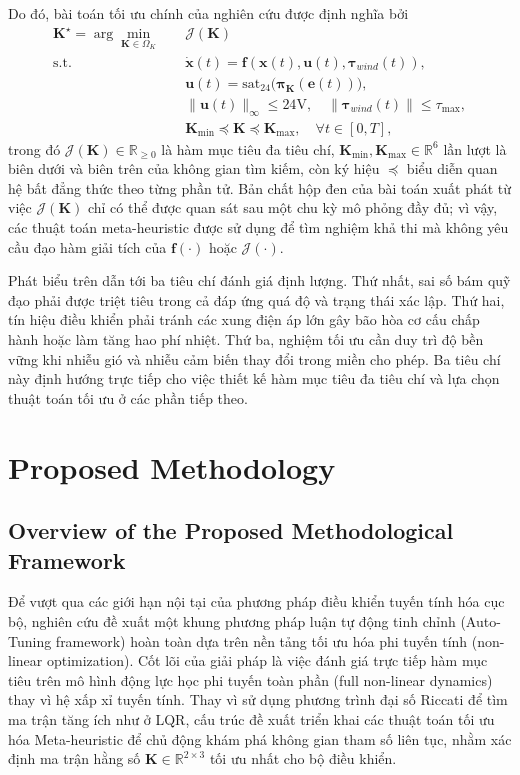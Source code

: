 \documentclass[conference, a4paper]{IEEEtran}
\begin{document}
Do đó, bài toán tối ưu chính của nghiên cứu được định nghĩa bởi
\begin{equation}
\begin{aligned}
\boldsymbol{K}^{\star} = \arg\min_{\boldsymbol{K} \in \Omega_K} \quad & \mathcal{J}(\boldsymbol{K}) \\
\mathrm{s.t.} \quad & \dot{\mathbf{x}}(t)=\mathbf{f}(\mathbf{x}(t),\mathbf{u}(t),\boldsymbol{\tau}_{wind}(t)), \\
& \mathbf{u}(t)=\mathrm{sat}_{24}\big(\boldsymbol{\pi}_{\boldsymbol{K}}(\mathbf{e}(t))\big), \\
& \|\mathbf{u}(t)\|_{\infty} \le 24\text{V}, \quad \|\boldsymbol{\tau}_{wind}(t)\| \le \tau_{\max}, \\
& \boldsymbol{K}_{\min} \preceq \boldsymbol{K} \preceq \boldsymbol{K}_{\max}, \quad \forall t \in [0,T],
\end{aligned}
\end{equation}
trong đó $\mathcal{J}(\boldsymbol{K}) \in \mathbb{R}_{\ge 0}$ là hàm mục tiêu đa tiêu chí, $\boldsymbol{K}_{\min},\boldsymbol{K}_{\max} \in \mathbb{R}^{6}$ lần lượt là biên dưới và biên trên của không gian tìm kiếm, còn ký hiệu $\preceq$ biểu diễn quan hệ bất đẳng thức theo từng phần tử. Bản chất hộp đen của bài toán xuất phát từ việc $\mathcal{J}(\boldsymbol{K})$ chỉ có thể được quan sát sau một chu kỳ mô phỏng đầy đủ; vì vậy, các thuật toán meta-heuristic được sử dụng để tìm nghiệm khả thi mà không yêu cầu đạo hàm giải tích của $\mathbf{f}(\cdot)$ hoặc $\mathcal{J}(\cdot)$.

Phát biểu trên dẫn tới ba tiêu chí đánh giá định lượng. Thứ nhất, sai số bám quỹ đạo phải được triệt tiêu trong cả đáp ứng quá độ và trạng thái xác lập. Thứ hai, tín hiệu điều khiển phải tránh các xung điện áp lớn gây bão hòa cơ cấu chấp hành hoặc làm tăng hao phí nhiệt. Thứ ba, nghiệm tối ưu cần duy trì độ bền vững khi nhiễu gió và nhiễu cảm biến thay đổi trong miền cho phép. Ba tiêu chí này định hướng trực tiếp cho việc thiết kế hàm mục tiêu đa tiêu chí và lựa chọn thuật toán tối ưu ở các phần tiếp theo.

\section{Proposed Methodology}

\subsection{Overview of the Proposed Methodological Framework}
Để vượt qua các giới hạn nội tại của phương pháp điều khiển tuyến tính hóa cục bộ, nghiên cứu đề xuất một khung phương pháp luận tự động tinh chỉnh (Auto-Tuning framework) hoàn toàn dựa trên nền tảng tối ưu hóa phi tuyến tính (non-linear optimization). Cốt lõi của giải pháp là việc đánh giá trực tiếp hàm mục tiêu trên mô hình động lực học phi tuyến toàn phần (full non-linear dynamics) thay vì hệ xấp xỉ tuyến tính. Thay vì sử dụng phương trình đại số Riccati để tìm ma trận tăng ích như ở LQR, cấu trúc đề xuất triển khai các thuật toán tối ưu hóa Meta-heuristic để chủ động khám phá không gian tham số liên tục, nhằm xác định ma trận hằng số $\boldsymbol{K} \in \mathbb{R}^{2 \times 3}$ tối ưu nhất cho bộ điều khiển.
\end{document}
